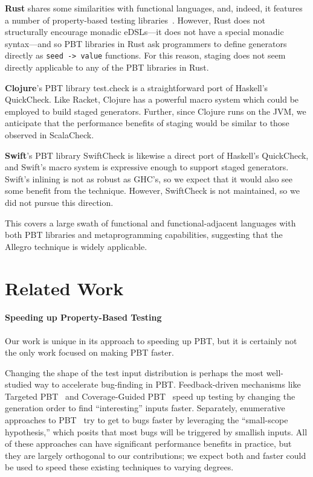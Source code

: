 \documentclass[acmsmall]{acmart}
\theoremstyle{definition}
\begin{document}
  \textbf{Rust} shares some similarities with functional languages, and,
  indeed, it features a number of property-based testing libraries~\cite{Bolero,ProptestBook}. However, Rust does not
  structurally encourage monadic eDSLs---it does not have a special monadic syntax---and so
  PBT libraries in Rust ask programmers to define generators directly as \texttt{seed -> value} functions.
  For this reason, staging does not seem directly applicable to any of
  the PBT libraries in Rust.

  \textbf{Clojure}'s PBT library test.check\cite{test.check} is a straightforward port
  of Haskell's QuickCheck. Like Racket, 
  Clojure has a powerful macro system which could be employed to build staged generators. Further, since
  Clojure runs on the JVM, we anticipate that the performance benefits of staging
  would be similar to those observed in ScalaCheck.

  \textbf{Swift}'s PBT library SwiftCheck\cite{swiftcheck} is likewise a direct port of Haskell's QuickCheck,
  and Swift's macro system\cite{swiftmac} is expressive enough to support staged generators. Swift's inlining is
  not as robust as GHC's, so we expect that it would also see some benefit from the \name{} technique. However,
  SwiftCheck is not maintained, so we did not pursue this direction.

This covers a large swath of functional and functional-adjacent languages with both PBT libraries and metaprogramming capabilities,
suggesting that the Allegro technique is widely applicable.

\section{Related Work}
\label{section:related}

\paragraph{Speeding up Property-Based Testing}

Our work is unique in its approach to speeding up
PBT, but it is certainly not the only work focused on making PBT faster.

Changing the shape of the test input distribution is perhaps the most well-studied way to accelerate bug-finding in PBT.
 Feedback-driven mechanisms
like Targeted PBT~\cite{loscherTargetedPropertybasedTesting2017} and
Coverage-Guided PBT~\cite{lampropoulosCoverageGuidedProperty2019}
speed up testing by changing the generation order to find
``interesting'' inputs faster. Separately, enumerative approaches to
PBT~\cite{runcimanSmallcheckLazySmallcheck2008,braquehaisSimpleIncrementalDevelopment2017}
try to get to bugs faster by leveraging the ``small-scope
hypothesis,'' which posits that most bugs will be triggered by smallish
inputs. All of these approaches can have significant performance
benefits in
practice, but they are largely orthogonal to our contributions; we expect
both \name{} and faster \rands{} could be used to speed these existing techniques to varying
degrees.
\end{document}
